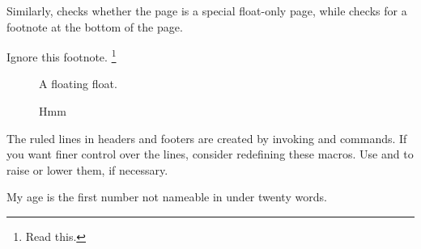 Similarly,  checks whether
the page is a special float-only page, while  checks for a
footnote at the bottom of the page.
\begin{example}[standalone, paperheight=4cm, to_page=2, vertical_pages]
\geometry{includehead, includefoot, headsep=.5em, footskip=1em} %
\sloppy %
\usepackage{fancyhdr}%
\usepackage{extramarks}%
\pagestyle{fancy}%


\noindent %
Ignore this footnote.%
\footnote{Read this.}
\begin{figure}[t]
  \centering
  A floating float.
  \caption{Hmm}
\end{figure}
\end{example}

The ruled lines in headers and footers are created by invoking 
and  commands. If you want finer control over the lines, consider
redefining these macros. Use  and  to raise
or lower them, if necessary.
\begin{example}[standalone, paperheight=4cm, paperwidth=3.2cm]
\geometry{includehead, includefoot, headsep=.5em, footskip=1em} %
\sloppy %
\usepackage{fancyhdr}%
\usepackage{extramarks}%
\pagestyle{fancy}%
\RenewDocumentCommand{\headrule}{}{
  \rule{0.05\headwidth}{0.2cm}%
  \rule[0.1cm]{0.9\headwidth}{\headrulewidth}%
  \rule{0.05\headwidth}{0.2cm}%
}

\RenewDocumentCommand{\headruleskip}{}{-0.2cm}

\noindent %
My age is the first number not
nameable in under twenty words.
\end{example}

